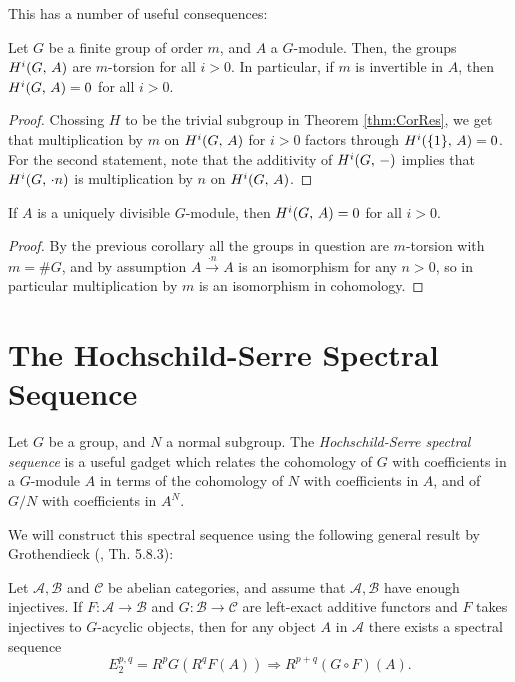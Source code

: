 \documentclass[a4paper, oneside]{memoir}
\begin{document}
This has a number of useful consequences:
\begin{corollary}
    Let $G$ be a finite group of order $m$, and $A$ a $G$-module. Then, the groups $H^{i}( G, \, A )$ are $m$-torsion for all $i>0$. In particular, if $m$ is invertible in $A$, then $H^{i}( G, \, A )=0$ for all $i>0$.
\end{corollary}
\begin{proof}
    Chossing $H$ to be the trivial subgroup in Theorem \ref{thm:CorRes}, we get that multiplication by $m$ on $H^{i}( G, \, A )$ for $i>0$ factors through $H^{i}( \{1\}, \, A )=0$. For the second statement, note that the additivity of $H^{i}( G, \, - )$ implies that $H^{i}( G, \, \cdot n )$ is multiplication by $n$ on $H^{i}( G, \, A )$.
\end{proof}

\begin{corollary}\label{cor:UniqDiv}
    If $A$ is a uniquely divisible $G$-module, then $H^{i}( G, \, A )=0$ for all $i>0$.
\end{corollary}
\begin{proof}
    By the previous corollary all the groups in question are $m$-torsion with $m=\#G$, and by assumption $A\overset{\cdot n}{\to} A$ is an isomorphism for any $n>0$, so in particular multiplication by $m$ is an isomorphism in cohomology.
\end{proof}

\section{The Hochschild-Serre Spectral Sequence}

Let $G$ be a group, and $N$ a normal subgroup. The \textit{Hochschild-Serre spectral sequence} is a useful gadget which relates the cohomology of $G$ with coefficients in a $G$-module $A$ in terms of the cohomology of $N$ with coefficients in $A$, and of $G / N$ with coefficients in $A^N$.

We will construct this spectral sequence using the following general result by Grothendieck (\cite{Weibel}, Th. 5.8.3):
\begin{theorem}
    Let $\mathcal{A}, \mathcal{B}$ and $\mathcal{C}$ be abelian categories, and assume that $\mathcal{A}, \mathcal{B}$ have enough injectives. If $F: \mathcal{A}\to \mathcal{B}$ and $G: \mathcal{B}\to \mathcal{C}$ are left-exact additive functors and $F$ takes injectives to $G$-acyclic objects, then for any object $A$ in $\mathcal{A}$ there exists a spectral sequence
    \[
        E_2^{p,q} = R^pG(R^qF(A)) \Longrightarrow R^{p+q}(G\circ F)(A).
    \]
\end{theorem}
\end{document}
